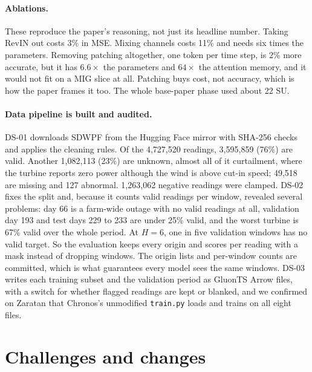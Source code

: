 \documentclass[11pt]{article}
\newcommand{\code}[1]{\texttt{\small #1}}
\begin{document}
\paragraph{Ablations.} These reproduce the paper's reasoning, not just its headline number. Taking RevIN out
costs 3\% in MSE. Mixing channels costs 11\% and needs six times the parameters. Removing patching altogether, one token per time step, is 2\% more accurate, but it has $6.6\times$ the parameters and $64\times$ the
attention memory, and it would not fit on a MIG slice at all. Patching buys cost, not accuracy, which is how the
paper frames it too. The whole base-paper phase used about 22 SU.

\paragraph{Data pipeline is built and audited.} DS-01 downloads SDWPF from the Hugging Face mirror with SHA-256
checks and applies the cleaning rules. Of the 4,727,520 readings, 3,595,859 (76\%) are valid. Another 1,082,113
(23\%) are unknown, almost all of it curtailment, where the turbine reports zero power although the wind is above
cut-in speed; 49,518 are missing and 127 abnormal. 1,263,062 negative readings were clamped. DS-02 fixes the split
and, because it counts valid readings per window, revealed several problems: day
66 is a farm-wide outage with no valid readings at all, validation day 193 and test days 229 to 233 are under 25\%
valid, and the worst turbine is 67\% valid over the whole period. At $H = 6$, one in five validation windows has
no valid target. So the evaluation keeps every origin and scores per reading with a mask instead of dropping
windows. The origin lists and per-window counts are committed, which is what guarantees every model sees the
same windows. DS-03 writes each training subset and the validation period as GluonTS Arrow files, with a switch
for whether flagged readings are kept or blanked, and we confirmed on Zaratan that Chronos's unmodified
\code{train.py} loads and trains on all eight files.

\section{Challenges and changes}
\end{document}
